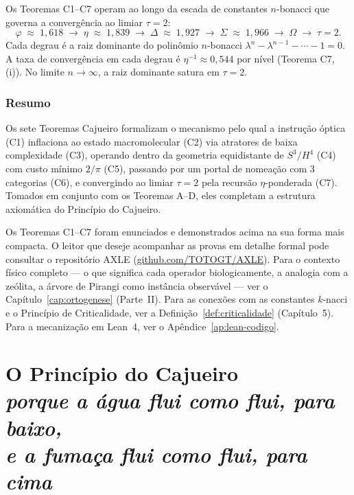\documentclass[12pt,a4paper,twoside]{book}
\theoremstyle{plain}
\theoremstyle{definition}
\theoremstyle{definition}
\begin{document}
Os Teoremas C1--C7 operam ao longo da escada de constantes $n$-bonacci
que governa a convergência ao limiar $\tau = 2$:
\[
  \varphi \;\approx\; 1{,}618 \;\longrightarrow\;
  \eta \;\approx\; 1{,}839 \;\longrightarrow\;
  \Delta \;\approx\; 1{,}927 \;\longrightarrow\;
  \Sigma \;\approx\; 1{,}966 \;\longrightarrow\;
  \Omega \;\to\; \tau = 2.
\]
Cada degrau é a raiz dominante do polinômio $n$-bonacci
$\lambda^{n} - \lambda^{n-1} - \cdots - 1 = 0$. A taxa de convergência
em cada degrau é $\eta^{-1} \approx 0{,}544$ por nível (Teorema C7, (i)).
No limite $n \to \infty$, a raiz dominante satura em $\tau = 2$.

\section{Resumo}

Os sete Teoremas Cajueiro formalizam o mecanismo pelo qual a instrução
óptica (C1) inflaciona ao estado macromolecular (C2) via atratores de
baixa complexidade (C3), operando dentro da geometria equidistante de
$S^{3}/H^{4}$ (C4) com custo mínimo $2/\pi$ (C5), passando por um portal
de nomeação com 3 categorias (C6), e convergindo ao limiar $\tau = 2$
pela recursão $\eta$-ponderada (C7). Tomados em conjunto com os Teoremas
A--D, eles completam a estrutura axiomática do Princípio do Cajueiro.


\begin{tcolorbox}[
  colback=cajugold!8,
  colframe=cajugold!50,
  title={Para o leitor que queira aprofundar},
  breakable
]
Os Teoremas C1--C7 foram enunciados e demonstrados acima na sua forma
mais compacta. O leitor que deseje acompanhar as provas em detalhe
formal pode consultar o repositório AXLE
(\href{https://github.com/TOTOGT/AXLE}{github.com/TOTOGT/AXLE}).
Para o contexto físico completo --- o que significa cada operador
biologicamente, a analogia com a zeólita, a árvore de Pirangi como
instância observável --- ver o Capítulo~\ref{cap:ortogenese} (Parte~II).
Para as conexões com as constantes $k$-nacci e o Princípio de
Criticalidade, ver a Definição~\ref{def:criticalidade} (Capítulo~5).
Para a mecanização em Lean~4, ver o Apêndice~\ref{ap:lean-codigo}.
\end{tcolorbox}

\bigskip

\part{O Princípio do Cajueiro\\[0.4cm]
{\large\normalfont\itshape porque a água flui como flui, para baixo,\\
e a fumaça flui como flui, para cima}}
\end{document}
